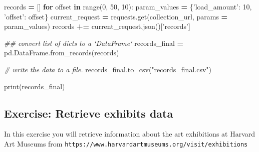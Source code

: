 \documentclass[]{book}
\newenvironment{Shaded}{\begin{snugshade}}{\end{snugshade}}
\newcommand{\KeywordTok}[1]{\textcolor[rgb]{0.13,0.29,0.53}{\textbf{#1}}}
\newcommand{\DecValTok}[1]{\textcolor[rgb]{0.00,0.00,0.81}{#1}}
\newcommand{\StringTok}[1]{\textcolor[rgb]{0.31,0.60,0.02}{#1}}
\newcommand{\CommentTok}[1]{\textcolor[rgb]{0.56,0.35,0.01}{\textit{#1}}}
\newcommand{\ControlFlowTok}[1]{\textcolor[rgb]{0.13,0.29,0.53}{\textbf{#1}}}
\newcommand{\OperatorTok}[1]{\textcolor[rgb]{0.81,0.36,0.00}{\textbf{#1}}}
\newcommand{\BuiltInTok}[1]{#1}
\newcommand{\NormalTok}[1]{#1}
\begin{document}
\begin{Shaded}
\begin{Highlighting}[]
\NormalTok{records }\OperatorTok{=}\NormalTok{ []}
\ControlFlowTok{for}\NormalTok{ offset }\KeywordTok{in} \BuiltInTok{range}\NormalTok{(}\DecValTok{0}\NormalTok{, }\DecValTok{50}\NormalTok{, }\DecValTok{10}\NormalTok{):}
\NormalTok{    param_values }\OperatorTok{=}\NormalTok{ \{}\StringTok{'load_amount'}\NormalTok{: }\DecValTok{10}\NormalTok{, }\StringTok{'offset'}\NormalTok{: offset\}}
\NormalTok{    current_request }\OperatorTok{=}\NormalTok{ requests.get(collection_url, params }\OperatorTok{=}\NormalTok{ param_values)}
\NormalTok{    records }\OperatorTok{+=}\NormalTok{ current_request.json()[}\StringTok{'records'}\NormalTok{]}
\end{Highlighting}
\end{Shaded}

\begin{Shaded}
\begin{Highlighting}[]
\CommentTok{## convert list of dicts to a `DataFrame`}
\NormalTok{records_final }\OperatorTok{=}\NormalTok{ pd.DataFrame.from_records(records)}
\end{Highlighting}
\end{Shaded}

\begin{Shaded}
\begin{Highlighting}[]
\CommentTok{# write the data to a file.}
\NormalTok{records_final.to_csv(}\StringTok{"records_final.csv"}\NormalTok{)}
\end{Highlighting}
\end{Shaded}

\begin{Shaded}
\begin{Highlighting}[]
\BuiltInTok{print}\NormalTok{(records_final)}
\end{Highlighting}
\end{Shaded}

\subsection{Exercise: Retrieve exhibits
data}\label{exercise-retrieve-exhibits-data}

In this exercise you will retrieve information about the art exhibitions
at Harvard Art Museums from
\texttt{https://www.harvardartmuseums.org/visit/exhibitions}
\end{document}
